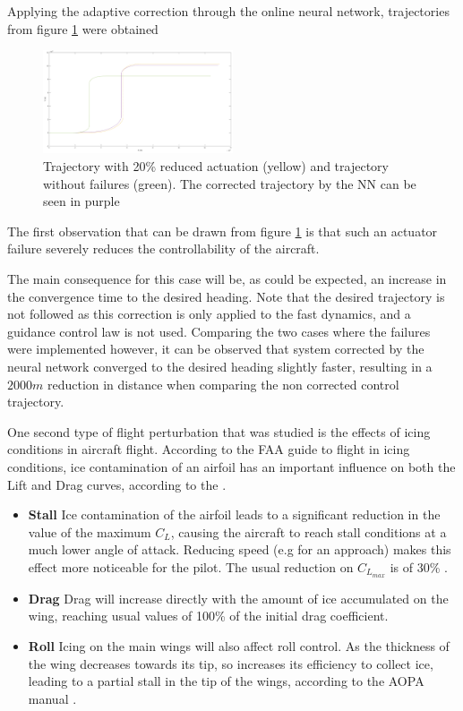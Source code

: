 Applying the adaptive correction through the online neural network, trajectories from figure \ref{fig:reduced_act_NN} were obtained

\begin{figure}[h]
\centering
\includegraphics[width=0.5\textwidth]{../Figures/Results/reduced_act_NN.png}
\caption[Trajectory with reduced actuation corrected with NN correction]{Trajectory with 20\% reduced actuation (yellow) and trajectory without failures (green). The corrected trajectory by the NN can be seen in purple}
\label{fig:reduced_act_NN}
\end{figure}

The first observation that can be drawn from figure \ref{fig:reduced_act_NN} is that such an actuator failure severely reduces the controllability of the aircraft. 

The main consequence for this case will be, as could be expected, an increase in the convergence time to the desired heading. Note that the desired trajectory is not followed as this correction is only applied to the fast dynamics, and a guidance control law is not used. Comparing the two cases where the failures were implemented however, it can be observed that system corrected by the neural network converged to the desired heading slightly faster, resulting in a $2000m$ reduction in distance when comparing the non corrected control trajectory. 

One second type of flight perturbation that was studied is the effects of icing conditions in aircraft flight. According to the FAA guide to flight in icing conditions, ice contamination of an airfoil has an important influence on both the Lift and Drag curves, according to the \cite{icing_cond}.

\begin{itemize}
\item \textbf{Stall }Ice contamination of the airfoil leads to a significant reduction in the value of the maximum $C_L$, causing the aircraft to reach stall conditions at a much lower angle of attack. Reducing speed (e.g for an approach) makes this effect more noticeable for the pilot. The usual reduction on $C_{L_{max}}$ is of 30\% \cite{icing_cond}.

\item \textbf{Drag }Drag will increase directly with the amount of ice accumulated on the wing, reaching usual values of 100\% of the initial drag coefficient.

\item \textbf{Roll }Icing on the main wings will also affect roll control. As the thickness of the wing decreases towards its tip, so increases its efficiency to collect ice, leading to a partial stall in the tip of the wings, according to the AOPA manual \cite{icing_aopa}.
\end{itemize}

